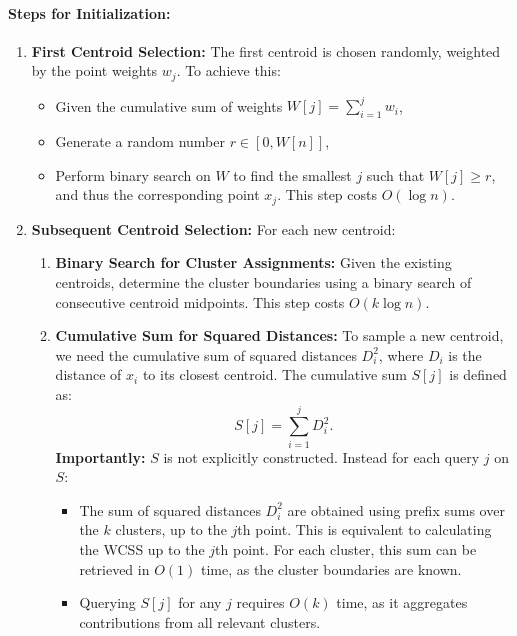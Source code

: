 \paragraph{Steps for Initialization:}
\begin{enumerate}
    \item \textbf{First Centroid Selection:}
    The first centroid is chosen randomly, weighted by the point weights \(w_j\). To achieve this:
    \begin{itemize}
        \item Given the cumulative sum of weights \(W[j] = \sum_{i=1}^j w_i\),
        \item Generate a random number \(r \in [0, W[n]]\),
        \item Perform binary search on \(W\) to find the smallest $j$ such that $W[j] \geq r$, and thus the corresponding point \(x_j\). This step costs \(O(\log n)\).
    \end{itemize}

    \item \textbf{Subsequent Centroid Selection:}
    For each new centroid:
    \begin{enumerate}
        \item \textbf{Binary Search for Cluster Assignments:}
        Given the existing centroids, determine the cluster boundaries using a binary search of consecutive centroid midpoints. This step costs \(O(k \log n)\).

        \item \textbf{Cumulative Sum for Squared Distances:}
        To sample a new centroid, we need the cumulative sum of squared distances \(D_i^2\), where \(D_i\) is the distance of \(x_i\) to its closest centroid. The cumulative sum \(S[j]\) is defined as:
        \[
        S[j] = \sum_{i=1}^j D_i^2.
        \]
        \textbf{Importantly:} \(S\) is not explicitly constructed. Instead for each query $j$ on $S$:
        \begin{itemize}
            \item The sum of squared distances \(D_i^2\) are obtained using prefix sums over the \(k\) clusters, up to the $j$th point. This is equivalent to calculating the WCSS up to the $j$th point. For each cluster, this sum can be retrieved in $O(1)$ time, as the cluster boundaries are known. 
            \item Querying \(S[j]\) for any \(j\) requires \(O(k)\) time, as it aggregates contributions from all relevant clusters.
        \end{itemize}


\end{enumerate}
\end{enumerate}
